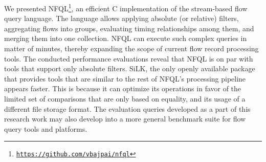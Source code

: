 We presented
\ac{NFQL}\footnote{\texttt{\url{https://github.com/vbajpai/nfql}}}, an
efficient C implementation of the stream-based flow query language. The
language allows applying absolute (or relative) filters, aggregating flows
into groups, evaluating timing relationships among them, and merging them into
one collection. \ac{NFQL} can execute such complex queries in matter of
minutes, thereby expanding the scope of current flow record processing tools.
The conducted performance evaluations reveal that \ac{NFQL} is on par with
tools that support only absolute filters. SiLK, the only openly available
package that provides tools that are similar to the rest of \ac{NFQL}'s
processing pipeline appears faster. This is because it can optimize its
operations in favor of the limited set of comparisons that are only based on
equality, and its usage of a different file storage format. The evaluation
queries developed as a part of this research work may also develop into a more
general benchmark suite for flow query tools and platforms.
